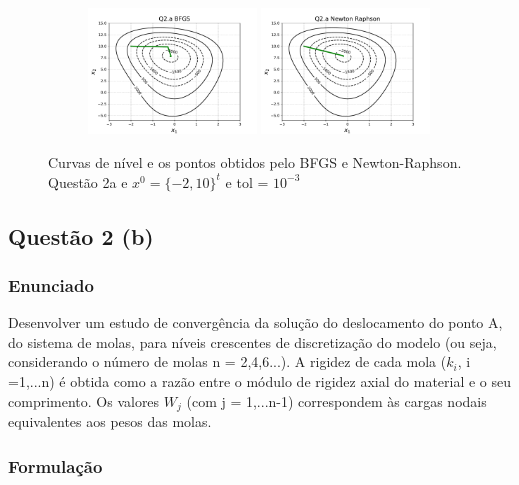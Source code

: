 \documentclass[10pt, a4paper]{article}
\begin{document}
\begin{figure}[H]
  \centering
  \begin{subfigure}[b]{\textwidth}
    \includegraphics[width=0.49\textwidth]{figuras/Q2.a_BFGS_P0=[-2 10].pdf}
    \includegraphics[width=0.49\textwidth]{figuras/Q2.a_Newton Raphson_P0=[-2 10].pdf}
  \end{subfigure}
  \caption{Curvas de nível e os pontos obtidos pelo BFGS e Newton-Raphson. Questão 2a e $x^0 = \{-2,10\}^t$ e tol = $10^{-3}$}
\end{figure}

\subsection{Questão 2 (b)}
\subsubsection{Enunciado}
Desenvolver um estudo de convergência da solução do deslocamento do ponto A, do sistema de molas, para níveis crescentes
de discretização do modelo (ou seja, considerando o número de molas n = 2,4,6...). A rigidez de cada mola ($k_i$, i =1,...n)
é obtida como a razão entre o módulo de rigidez axial do material e o seu comprimento. Os valores $W_j$ (com j = 1,...n-1)
correspondem às cargas nodais equivalentes aos pesos das molas.

\subsubsection{Formulação}
\end{document}
